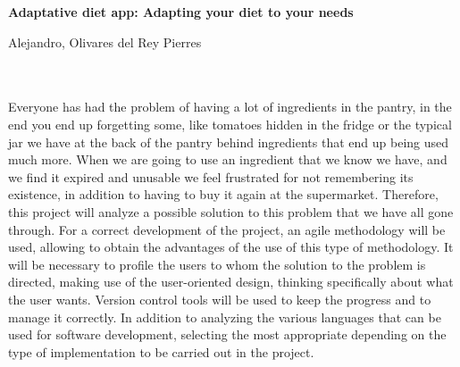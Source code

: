 \thispagestyle{empty}


\begin{center}
{\large\bfseries Adaptative diet app: Adapting your diet to your needs}\\
\end{center}
\begin{center}
Alejandro, Olivares del Rey Pierres \\
\end{center}

\\

\vspace{0.7cm}
\\

Everyone has had the problem of having a lot of ingredients in the pantry, in the end you end up forgetting some, like tomatoes hidden in the fridge or the typical jar we have at the back of the pantry behind ingredients that end up being used much more. When we are going to use an ingredient that we know we have, and we find it expired and unusable we feel frustrated for not remembering its existence, in addition to having to buy it again at the supermarket. Therefore, this project will analyze a possible solution to this problem that we have all gone through. For a correct development of the project, an agile methodology will be used, allowing to obtain the advantages of the use of this type of methodology. It will be necessary to profile the users to whom the solution to the problem is directed, making use of the user-oriented design, thinking specifically about what the user wants. Version control tools will be used to keep the progress and to manage it correctly. In addition to analyzing the various languages that can be used for software development, selecting the most appropriate depending on the type of implementation to be carried out in the project.

